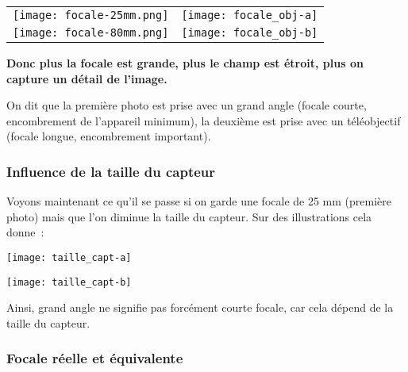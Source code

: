\documentclass[../main/main.tex]{subfiles}
\begin{document}
\begin{center}
    \begin{tabular}{cc} \texttt{[image: focale-25mm.png]} & 
        \texttt{[image: focale\_obj-a]} \\
        \texttt{[image: focale-80mm.png]} & 
        \texttt{[image: focale\_obj-b]} \\
    \end{tabular}
\end{center}

\medskip

\textbf{Donc plus la focale est grande, plus le champ est étroit, plus on
capture un détail de l'image.}\newline

On dit que la première photo est prise avec un grand angle (focale courte,
encombrement de l'appareil minimum), la deuxième est prise avec un téléobjectif
(focale longue, encombrement important).

\subsubsection{Influence de la taille du capteur}

Voyons maintenant ce qu'il se passe si on garde une focale de 25 mm (première
photo) mais que l'on diminue la taille du capteur. Sur des illustrations cela
donne~:

\begin{minipage}{0.49\linewidth}
    \begin{center}
         \texttt{[image: taille\_capt-a]} \\
    \end{center}
\end{minipage}
\begin{minipage}{0.49\linewidth}
    \begin{center}
         \texttt{[image: taille\_capt-b]} \\
    \end{center}
\end{minipage}

\medskip

Ainsi, grand angle ne signifie pas forcément courte focale, car cela dépend de
la taille du capteur.\newline


\subsubsection{Focale réelle et équivalente}
\end{document}

